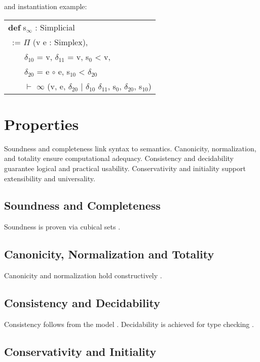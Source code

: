 \documentclass{article}
\theoremstyle{definition}
\newcommand{\tabstyle}[0]{\scriptsize\ttfamily\fontseries{l}\selectfont}
\begin{document}
and instantiation example:

\begin{table}[ht!]
\tabstyle
\begin{tabular}{l}

\textbf{def} s$_\infty$ : Simplicial \\
\ := $\Pi$ (v e : Simplex), \\
\ \ \ \ $\delta_{10}$ = v, $\delta_{11}$ = v, s$_0$ < v, \\
\ \ \ \ $\delta_{20}$ = e $\circ$ e, s$_{10}$ < $\delta_{20}$ \\
\ \ \ \ $\vdash$ $\infty$ (v, e, $\delta_{20}$ | $\delta_{10}$ $\delta_{11}$, s$_0$, $\delta_{20}$, s$_{10}$)
\end{tabular}
\end{table}

\newpage
\section{Properties}

Soundness and completeness link syntax to semantics.
Canonicity, normalization, and totality ensure computational adequacy.
Consistency and decidability guarantee logical and practical usability.
Conservativity and initiality support extensibility and universality.

\subsection{Soundness and Completeness}

Soundness is proven via cubical sets \cite{CCHM, Awodey12, Coquand18}.

\subsection{Canonicity, Normalization and Totality}

Canonicity and normalization hold constructively \cite{Huber17, Streicher91}.

\subsection{Consistency and Decidability}

Consistency follows from the model \cite{Bezem14}.
Decidability is achieved for type checking \cite{Coquand18}.

\subsection{Conservativity and Initiality}
\end{document}

